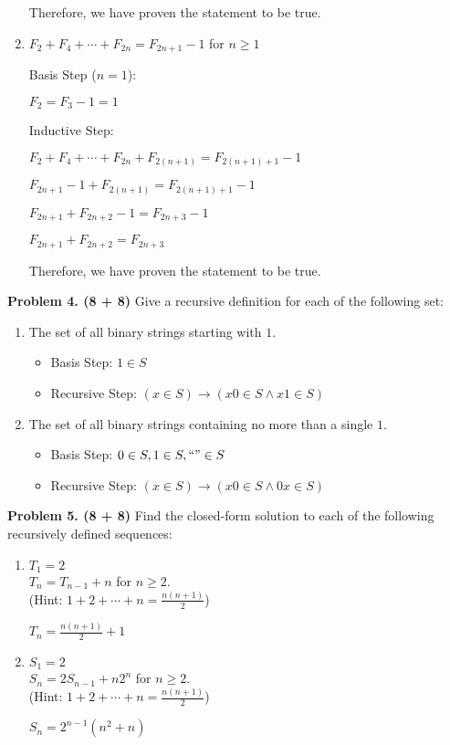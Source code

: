 \documentclass[12pt,twoside]{article}
\begin{document}
\begin{enumerate}
	Therefore, we have proven the statement to be true.

	\newpage
	\item
	$F_2 + F_4 + \cdots + F_{2n} = F_{2n+1} - 1$ for $n \geq 1$

	Basis Step ($n = 1$):

	$F_2 = F_3 - 1 = 1$

	Inductive Step:

	$F_2 + F_4 + \cdots + F_{2n} + F_{2(n+1)} = F_{2(n+1)+1} - 1$

	$F_{2n+1} - 1 + F_{2(n+1)} = F_{2(n+1)+1} - 1$

	$F_{2n+1} + F_{2n+2} - 1= F_{2n+3} -1$

	$F_{2n+1} + F_{2n+2}= F_{2n+3}$

	Therefore, we have proven the statement to be true.

\end{enumerate}
%
%
\newpage

{\bf Problem 4. (8 + 8)}
%
Give a recursive definition for each of the following set:

\begin{enumerate}
	\item
	The set of all binary strings starting with $1$.

	\begin{itemize}
		\item Basis Step: $1 \in S$
		\item Recursive Step: $(x \in S) \to (x0 \in S \land x1 \in S)$
	\end{itemize}

	\newpage
	\item
	The set of all binary strings containing no more than a single $1$.

	\begin{itemize}
		\item Basis Step: $0 \in S, 1 \in S, ``" \in S$
		\item Recursive Step: $(x \in S) \to (x0 \in S \land 0x \in S)$
	\end{itemize}

\end{enumerate}
%

%
%
\newpage

{\bf Problem 5. (8 + 8)}
%
Find the closed-form solution to each of the following recursively defined sequences:

\begin{enumerate}
	\item
	$T_1=2$ \\
	$T_n=T_{n-1}+n$ for $n \ge 2.$ \\
	(Hint: $1 + 2 + \cdots + n = \frac{n(n+1)}{2}$)

	$T_n = \frac{n(n+1)}{2} + 1$

	\vspace{3.5in}
	\item
	$S_1 = 2$ \\
	$S_n = 2S_{n-1} + n2^n$ for $n \geq 2$. \\
	(Hint: $1 + 2 + \cdots + n = \frac{n(n+1)}{2}$)

	$S_n = 2^{n-1}(n^2+n)$

\end{enumerate}
\end{document}
